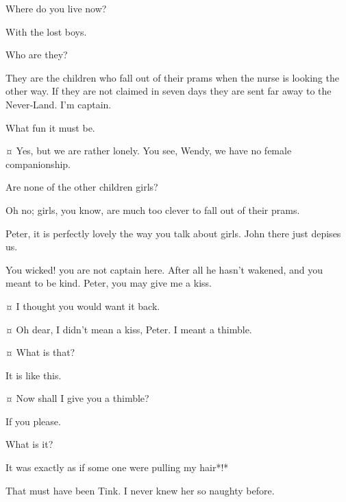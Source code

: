 \begin{drama}
\wendyspeaks
Where do you live now?

\peterspeaks
With the lost boys.

\wendyspeaks
Who are they?

\peterspeaks
They are the children who fall out of their prams when the nurse is looking the other way.
If they are not claimed in seven days they are sent far away to the Never‐Land.
I’m captain.

\wendyspeaks
What fun it must be.

\peterspeaks {}¤
Yes, but we are rather lonely.
You see, Wendy, we have no female companionship.

\wendyspeaks
Are none of the other children girls?

\peterspeaks
Oh no; girls, you know, are much too clever to fall out of their prams.

\wendyspeaks
Peter, it is perfectly lovely the way you talk about girls.
John there just depises us.


\speakercontinues
You wicked!
you are not captain here.
After all he hasn’t wakened, and you meant to be kind.
Peter, you may give me a kiss.

\peterspeaks {}¤
I thought you would want it back.

\wendyspeaks {}¤
Oh dear, I didn’t mean a kiss, Peter.
I meant a thimble.

\peterspeaks {}¤
What is that?

\wendyspeaks
It is like this.

\peterspeaks {}¤
Now shall I give you a thimble?

\wendyspeaks
If you please.

\peterspeaks
What is it?

\wendyspeaks
It was exactly as if some one were pulling my hair*!*

\peterspeaks
That must have been Tink.
I never knew her so naughty before.



\end{drama}
